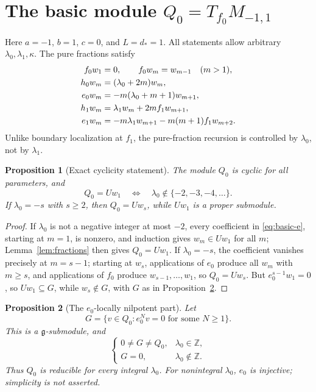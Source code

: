 \documentclass[11pt,a4paper]{article}
\newcommand{\Z}{\mathbb Z}
\newcommand{\g}{\mathfrak g}
\theoremstyle{plainupright}
\newtheorem{proposition}{Proposition}[section]
\begin{document}
\section{The basic module \texorpdfstring{\(Q_0=T_{f_0}M_{-1,1}\)}{Q0}}\label{sec:basic}

Here \(a=-1\), \(b=1\), \(c=0\), and \(L=d_*=1\). All statements allow
arbitrary \(\lambda_0,\lambda_1,\kappa\). The pure fractions satisfy
\begin{align}
f_0w_1&=0,\qquad f_0w_m=w_{m-1}\quad(m>1),\notag\\
h_0w_m&=(\lambda_0+2m)w_m,\label{eq:basic}\\
e_0w_m&=-m(\lambda_0+m+1)w_{m+1},\label{eq:basic-e}\\
h_1w_m&=\lambda_1w_m+2mf_1w_{m+1},\notag\\
e_1w_m&=-m\lambda_1w_{m+1}-m(m+1)f_1w_{m+2}.\notag
\end{align}
Unlike boundary localization at \(f_1\), the pure-fraction recursion is
controlled by \(\lambda_0\), not by \(\lambda_1\).

\begin{proposition}[Exact cyclicity statement]\label{prop:cyclic}
The module \(Q_0\) is cyclic for all parameters, and
\[
Q_0=Uw_1\quad\Longleftrightarrow\quad
\lambda_0\notin\{-2,-3,-4,\ldots\}.
\]
If \(\lambda_0=-s\) with \(s\ge2\), then \(Q_0=Uw_s\), while \(Uw_1\) is a
proper submodule.
\end{proposition}

\begin{proof}
If \(\lambda_0\) is not a negative integer at most \(-2\), every coefficient
in \eqref{eq:basic-e}, starting at \(m=1\), is nonzero, and induction gives
\(w_m\in Uw_1\) for all \(m\); Lemma~\ref{lem:fractions} then gives
\(Q_0=Uw_1\). If \(\lambda_0=-s\), the coefficient vanishes precisely at
\(m=s-1\); starting at \(w_s\), applications of \(e_0\) produce all \(w_m\)
with \(m\ge s\), and applications of \(f_0\) produce \(w_{s-1},\ldots,w_1\),
so \(Q_0=Uw_s\). But \(e_0^{s-1}w_1=0\), so \(Uw_1\subseteq G\), while
\(w_s\notin G\), with \(G\) as in Proposition~\ref{prop:integer}.
\end{proof}

\begin{proposition}[The \(e_0\)-locally nilpotent part]\label{prop:integer}
Let
\[
G=\{v\in Q_0:e_0^Nv=0\text{ for some }N\ge1\}.
\]
This is a \(\g\)-submodule, and
\[
\begin{cases}
0\ne G\ne Q_0,&\lambda_0\in\Z,\\
G=0,&\lambda_0\notin\Z.
\end{cases}
\]
Thus \(Q_0\) is reducible for every integral \(\lambda_0\). For nonintegral
\(\lambda_0\), \(e_0\) is injective; simplicity is not asserted.
\end{proposition}
\end{document}
